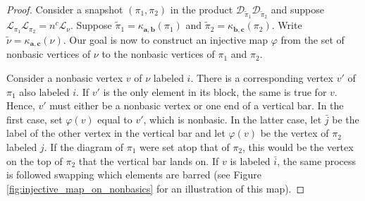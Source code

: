 \documentclass[ALCO,Unicode,published]{cedram}
\newcommand{\DD}{\mathcal{D}}
\newcommand{\LL}{\mathcal{L}}
\newcommand{\bfa}{{\boldsymbol{a}}}
\newcommand{\bfb}{{\boldsymbol{b}}}
\newcommand{\bfc}{{\boldsymbol{c}}}
\newcommand{\tpi}{{\tilde{\pi}}}
\newcommand{\tnu}{{\tilde{\nu}}}
\newcommand{\ov}[1]{\bar{#1}}
\begin{document}
\begin{proof}
    Consider a snapshot $(\pi_1,\pi_2)$ in the product $\DD_{\tpi_1}\DD_{\tpi_2}$ and suppose $\LL_{\pi_1}\LL_{\pi_2}=n^c\LL_\nu$. Suppose $\tpi_1=\kappa_{\bfa,\bfb}(\pi_1)$ and $\tpi_2=\kappa_{\bfb,\bfc}(\pi_2)$. Write $\tnu=\kappa_{\bfa,\bfc}(\nu)$. Our goal is now to construct an injective map $\varphi$ from the set of nonbasic vertices of $\nu$ to the nonbasic vertices of $\pi_1$ and $\pi_2$. 
    
    Consider a nonbasic vertex $v$ of $\nu$ labeled $i$. There is a corresponding vertex $v'$ of $\pi_1$ also labeled $i$. If $v'$ is the only element in its block, the same is true for $v$. Hence, $v'$ must either be a nonbasic vertex or one end of a vertical bar. In the first case, set $\varphi(v)$ equal to $v'$, which is nonbasic. In the latter case, let $\ov j$ be the label of the other vertex in the vertical bar and let $\varphi(v)$ be the vertex of $\pi_2$ labeled $j$. If the diagram of $\pi_1$ were set atop that of $\pi_2$, this would be the vertex on the top of $\pi_2$ that the vertical bar lands on. If $v$ is labeled $\ov i$, the same process is followed swapping which elements are barred (see Figure \ref{fig:injective_map_on_nonbasics} for an illustration of this map).


\end{proof}
\end{document}
